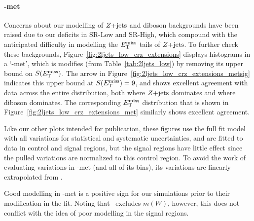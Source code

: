 \paragraph{\crz-met}
Concerns about our modelling of $Z\mathrm{+jets}$ and diboson backgrounds have been
raised due to our deficits in SR-Low and SR-High, which compound with the
anticipated difficulty in modelling the $E_\mathrm{T}^\mathrm{miss}$ tails of $Z\mathrm{+jets}$.
To further check these backgrounds, Figure~\ref{fig:2ljets_low_crz_extensions}
displays histograms in a `\crz-met', which is modifies \crz
(from Table~\ref{tab:2ljets_low}) by removing its upper bound on $S(E_\mathrm{T}^\mathrm{miss})$.
The arrow in Figure~\ref{fig:2ljets_low_crz_extensions_metsig} indicates this
upper bound at $S(E_\mathrm{T}^\mathrm{miss}) = 9$, and shows excellent agreement with data across
the entire distribution, both where $Z\mathrm{+jets}$ dominates and where diboson
dominates.
The corresponding $E_\mathrm{T}^\mathrm{miss}$ distribution that is shown in
Figure~\ref{fig:2ljets_low_crz_extensions_met}
similarly shows excellent agreement.

Like our other plots intended for publication, these figures use the full fit
model with all variations for statistical and systematic uncertainties,
and are fitted to data in control and signal regions, but the signal regions
have little effect since the pulled variations are normalized to this control
region.
To avoid the work of evaluating variations in \crz-met (and all of its bins),
its variations are linearly extrapolated from \crz.

Good modelling in \crz-met is a positive sign for our simulations prior to
their modification in the fit.
Noting that \crz\ excludes $m(W)$, however, this does not conflict with the idea
of poor modelling in the signal regions.

